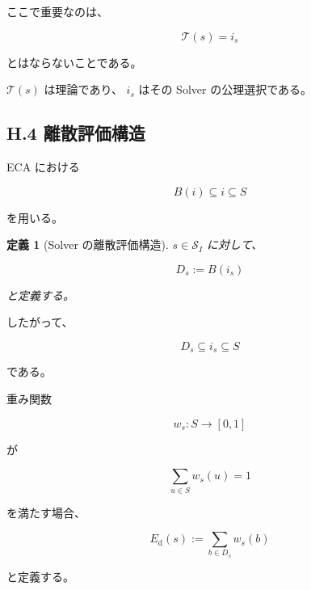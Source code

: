 \documentclass[a4paper,11pt]{article}
\newtheorem{definition}{定義}[section]
\newcommand{\Solver}{\mathcal{S}}
\begin{document}
ここで重要なのは、

\begin{equation}
    \mathcal{T}(s)=i_s
\end{equation}

とはならないことである。

$\mathcal{T}(s)$ は理論であり、
$i_s$ はその Solver の公理選択である。


\subsection{H.4 離散評価構造}

ECA における

\begin{equation}
    B(i)\subseteq i\subseteq S
\end{equation}

を用いる。

\begin{definition}[Solver の離散評価構造]
$s\in\Solver_I$ に対して、

\begin{equation}
    \boxed{
        D_s
        :=
        B(i_s)
    }
\end{equation}

と定義する。
\end{definition}

したがって、

\begin{equation}
    D_s\subseteq i_s\subseteq S
\end{equation}

である。

重み関数

\begin{equation}
    w_s:S\to[0,1]
\end{equation}

が

\begin{equation}
    \sum_{u\in S}w_s(u)=1
\end{equation}

を満たす場合、

\begin{equation}
    \boxed{
        E_{\mathrm d}(s)
        :=
        \sum_{b\in D_s}w_s(b)
    }
\end{equation}

と定義する。

\end{document}
